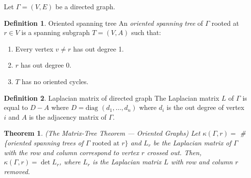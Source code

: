 \documentclass[11pt]{article}
\newtheorem{theorem}{Theorem}[section]
\theoremstyle{definition}
\newtheorem{definition}{Definition}[section]
\begin{document}
	Let $\Gamma = (V,E)$ be a directed graph.
	
	\theoremstyle{definition}
	\begin{definition}{Oriented spanning tree}
			An \emph{oriented spanning tree} of $\Gamma$ rooted at $r \in V$ is a spanning subgraph $T = (V,A)$ such that:
			\begin{enumerate}
				\item Every vertex $v \neq r$ has out degree 1.
				\item $r$ has out degree 0.
				\item $T$ has no oriented cycles.
			\end{enumerate}
	\end{definition}
	
	\theoremstyle{definition}
	\begin{definition}{Laplacian matrix of directed graph}
			The Laplacian matrix $L$ of $\Gamma$ is equal to $D-A$ where $D = \text{diag } (d_1, \dots, d_n)$ where $d_i$ is the out degree of vertex $i$ and $A$ is the adjacency matrix of $\Gamma$.
	\end{definition}
	
	\begin{theorem}{(The Matrix-Tree Theorem --- Oriented Graphs)}
			Let $\kappa(\Gamma, r) =$ \# \{oriented spanning trees of $\Gamma \text{ rooted at } r\}$ and $L_r$ be the Laplacian matrix of $\Gamma$ with the row and column correspond to vertex $r$ crossed out. 
			Then, $\kappa(\Gamma, r) = \det L_r$, where $L_r$ is the Laplacian matrix $L$ with row and column $r$ removed.
	\end{theorem}
	
\end{document}
